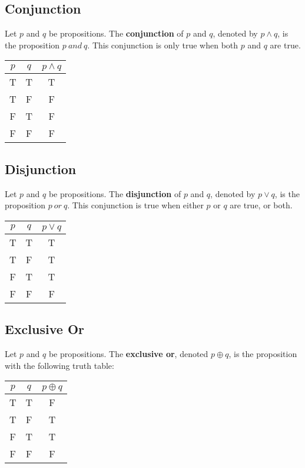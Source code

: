 \documentclass[letterpaper, 12pt]{math}
\begin{document}
\subsection*{Conjunction}
Let \( p \) and \( q \) be propositions. The \textbf{conjunction} of \( p \)
and \( q \), denoted by \( p \wedge q \), is the proposition \( p\ and\ q \).
This conjunction is only true when both \( p \) and \( q \) are true.
\begin{center}
  \begin{tabular}{|c|c|c|}
    \hline
    \( p \) & \( q \) & \( p \wedge q \) \\ \hline
    T       & T       & T \\ \hline
    T       & F       & F \\ \hline
    F       & T       & F \\ \hline
    F       & F       & F \\ \hline
  \end{tabular}
\end{center}

\subsection*{Disjunction}
Let \( p \) and \( q \) be propositions. The \textbf{disjunction} of \( p \)
and \( q \), denoted by \( p \vee q \), is the proposition \( p\ or\ q \).
This conjunction is true when either \( p \) or \( q \) are true, or both.
\begin{center}
  \begin{tabular}{|c|c|c|}
    \hline
    \( p \) & \( q \) & \( p \vee q \) \\ \hline
    T       & T       & T \\ \hline
    T       & F       & T \\ \hline
    F       & T       & T \\ \hline
    F       & F       & F \\ \hline
  \end{tabular}
\end{center}

\subsection*{Exclusive Or}
Let \( p \) and \( q \) be propositions. The \textbf{exclusive or}, denoted
\( p \oplus q \), is the proposition with the following truth table:
\begin{center}
  \begin{tabular}{|c|c|c|}
    \hline
    \( p \) & \( q \) & \( p \oplus q \) \\ \hline
    T       & T       & F \\ \hline
    T       & F       & T \\ \hline
    F       & T       & T \\ \hline
    F       & F       & F \\ \hline
  \end{tabular}
\end{center}
\end{document}
